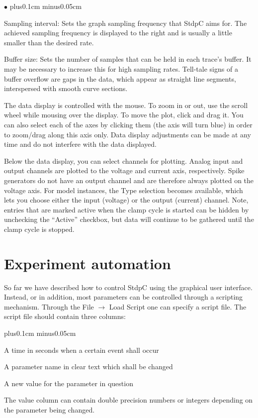 \documentclass{article}
\makeatletter
\newenvironment{myenum}{
\begin{list}{\labelenumi}{\setlength{\leftmargin}{1.3em}
  \setcounter{enumi}{0}
  \renewcommand{\item}{\addtocounter{enumi}{1}\unskip \vspace{-0.1cm}\@inmatherr\item
  \@ifnextchar [\@item{\@noitemargtrue \@item[\@itemlabel]} \unskip}}
  \itemsep0.1cm plus0.1cm minus0.05cm
  \listparindent0cm
  \setlength{\labelsep}{0.5em}
  \setlength{\labelwidth}{0.8em}}
{\end{list}}
\newenvironment{myitem}{\begin{list}{$\bullet$}{\setlength{\leftmargin}{1.1em}
\itemsep0.1cm plus0.1cm minus0.05cm
\listparindent0cm
\addtolength{\labelsep}{0.5\labelsep}
\setlength{\labelwidth}{0.8em}
\setlength{\leftmargin}{\labelwidth}
\addtolength{\leftmargin}{\labelsep}
}}{\end{list}}
\makeatother
\begin{document}
\begin{myitem}
\item Sampling interval: Sets the graph sampling frequency that StdpC aims for.
The achieved sampling frequency is displayed to the right and is usually a little
smaller than the desired rate.
\item Buffer size: Sets the number of samples that can be held in each trace's buffer.
It may be necessary to increase this for high sampling rates. Tell-tale signs of a
buffer overflow are gaps in the data, which appear as straight line segments,
interspersed with smooth curve sections.
\item The data display is controlled with the mouse. To zoom in or out, use the scroll
wheel while mousing over the display. To move the plot, click and drag it. You can also select
each of the axes by clicking them (the axis will turn blue) in order to zoom/drag along
this axis only. Data display adjustments can be made at any time and do not interfere with
the data displayed.
\item Below the data display, you can select channels for plotting. Analog input and output
channels are plotted to the voltage and current axis, respectively. Spike generators
do not have an output channel and are therefore always plotted on the voltage axis.
For model instances, the Type selection becomes available, which lets you choose either
the input (voltage) or the output (current) channel. Note, entries that are marked
active when the clamp cycle is started can be hidden by unchecking the ``Active'' checkbox,
but data will continue to be gathered until the clamp cycle is stopped.
\end{myitem}


\section{Experiment automation} \label{scriptsect}

So far we have described how to control StdpC using the graphical
user interface. Instead, or in addition, most parameters can be
controlled through a scripting mechanism. Through the
File $\rightarrow$ Load Script one can specify a script file. The script
file should contain three columns:
\begin{myenum}
\item A time in seconds when a certain event shall occur
\item A parameter name in clear text which shall be changed
\item A new value for the parameter in question
\end{myenum}
The value column can contain double precision numbers or integers
depending on the parameter being changed.
\end{document}
